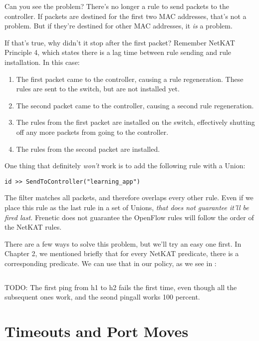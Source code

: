 Can you see the problem?  There's no longer a rule to send packets to the controller.  If packets
are destined for the first two MAC addresses, that's not a problem.  But if they're destined for
other MAC addresses, it \emph{is} a problem.

If that's true, why didn't it stop after the first packet?  Remember NetKAT Principle 4, which 
states there is a lag time between rule sending and rule installation.  In this case:

\begin{enumerate}
\item The first packet came to the controller, causing a rule regeneration.  These rules
are sent to the switch, but are not installed yet.
\item The second packet came to the controller, causing a second rule regeneration.
\item The rules from the first packet are installed on the switch, effectively shutting off 
any more packets from going to the controller.
\item The rules from the second packet are installed.  
\end{enumerate}

One thing that definitely \emph{won't} work is to add the following rule with a Union:

\begin{verbatim}
id >> SendToController("learning_app")
\end{verbatim}

The  filter matches all packets, and therefore overlaps every other rule.  Even if we place this
rule as the last rule in a set of Unions, \emph{that does not guarantee it'll be fired last.}  Frenetic 
does not guarantee the OpenFlow rules will follow the order of the NetKAT rules.     

There are a few ways to solve this problem, but we'll try an easy one first.  
In Chapter 2, we mentioned briefly that for every  NetKAT predicate, there is a corresponding
 predicate.  We can use that in our policy, as we see in :

\inputminted[firstline=30,lastline=36]{python}{code/l2_learning_switch/learning3.py}

TODO: The first ping from h1 to h2 fails the first time, even though all the subsequent ones work, and 
the seond pingall works 100 percent.  

\section{Timeouts and Port Moves}
\label{l2_learning_switch:timeouts}

